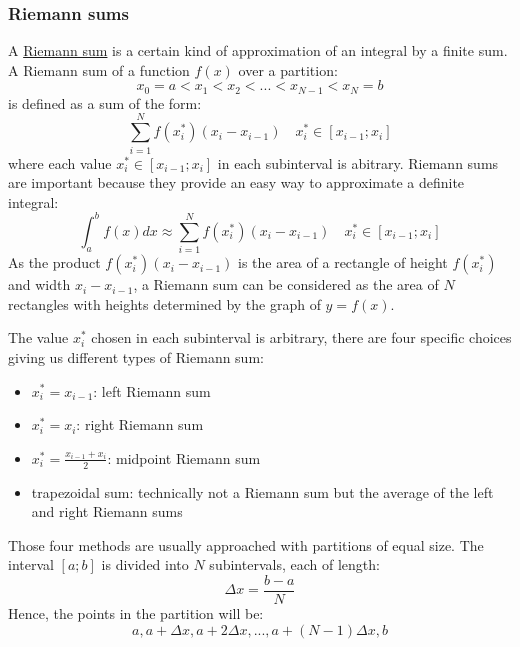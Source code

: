 \subsubsection{Riemann sums}
A \href{https://en.wikipedia.org/wiki/Riemann_sum}{Riemann sum} is a certain kind of approximation of an integral by a finite sum. A Riemann sum of a function $f(x)$ over a partition:
\begin{equation}
	x_0 = a < x_1 < x_2 < ... < x_{N-1} < x_N = b
\end{equation}
is defined as a sum of the form:
\begin{equation}
	\sum_{i=1}^N f(x_i^*) (x_i - x_{i-1}) \quad x_i^* \in [x_{i-1}; x_i]
\end{equation}
where each value $x_i^* \in [x_{i-1}; x_i]$ in each subinterval is abitrary. Riemann sums are important because they provide an easy way to approximate a definite integral:
\begin{equation}
	\int_a^b f(x) dx \approx \sum_{i=1}^N f(x_i^*) (x_i - x_{i-1}) \quad x_i^* \in [x_{i-1}; x_i]
\end{equation}
As the product $f(x_i^*) (x_i - x_{i-1})$ is the area of a rectangle of height $f(x_i^*)$ and width $x_i - x_{i-1}$, a Riemann sum can be considered as the area of $N$ rectangles with heights determined by the graph of $y=f(x)$.

The value $x_i^*$ chosen in each subinterval is arbitrary, there are four specific choices giving us different types of Riemann sum:
\begin{itemize}
	\setlength\itemsep{0em}
	\item $x_i^* = x_{i-1}$: left Riemann sum
	\item $x_i^* = x_{i}$: right Riemann sum
	\item $x_i^* = \frac{x_{i-1} + x_i}{2}$: midpoint Riemann sum
	\item trapezoidal sum: technically not a Riemann sum but the average of the left and right Riemann sums
\end{itemize}
Those four methods are usually approached with partitions of equal size. The interval $[a;b]$ is divided into $N$ subintervals, each of length:
\begin{equation}
	\Delta x = \frac{b-a}{N}
\end{equation}
Hence, the points in the partition will be:
\begin{equation}
	a, a + \Delta x, a + 2\Delta x, ..., a + (N-1)\Delta x, b
\end{equation}
\\


